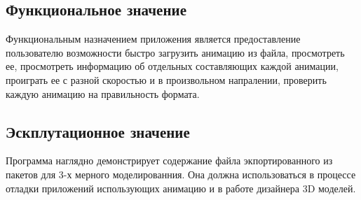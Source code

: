 \subsection{Функциональное значение}
Функциональным назначением приложения является предоставление пользователю возможности быстро загрузить  анимацию из файла, просмотреть ее, просмотреть информацию об отдельных составляющих каждой анимации, проиграть ее с разной скоростью и в произвольном напралении, проверить каждую анимацию на правильность формата.

\subsection{Эскплутационное значение}
Программа наглядно демонстрирует содержание файла экпортированного из пакетов для 3-х мерного моделированния. Она должна использоваться в процессе отладки приложений использующих анимацию и в работе дизайнера  3D моделей.

